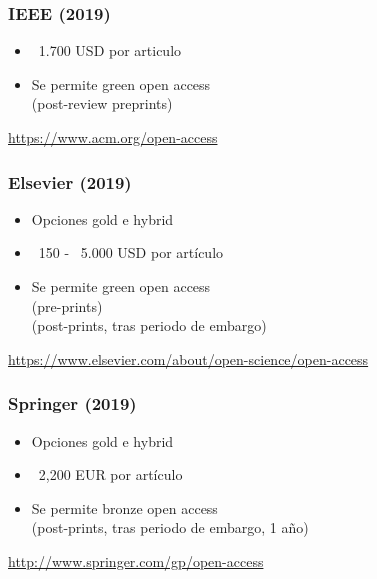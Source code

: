 \documentclass[17pt,aspectratio=169]{beamer}
\begin{document}
\begin{frame}
\frametitle{IEEE (2019)}

\begin{itemize}
\item ~1.700 USD por articulo
\item Se permite green open access \\
  (post-review preprints) \\
\end{itemize}

\begin{flushright}
{\footnotesize \url{https://www.acm.org/open-access}}
\end{flushright}

\end{frame}

\begin{frame}
\frametitle{Elsevier (2019)}

\begin{itemize}
\item Opciones gold e hybrid
\item ~150 - ~5.000 USD por artículo
\item Se permite green open access \\
  (pre-prints) \\
  (post-prints, tras periodo de embargo) \\
\end{itemize}

\begin{flushright}
{\footnotesize \url{https://www.elsevier.com/about/open-science/open-access}}
\end{flushright}

\end{frame}

\begin{frame}
\frametitle{Springer (2019)}

\begin{itemize}
\item Opciones gold e hybrid
\item ~2,200 EUR por artículo
\item Se permite bronze open access \\
  (post-prints, tras periodo de embargo, 1 año) \\
\end{itemize}

\begin{flushright}
{\footnotesize \url{http://www.springer.com/gp/open-access}}
\end{flushright}

\end{frame}
\end{document}
